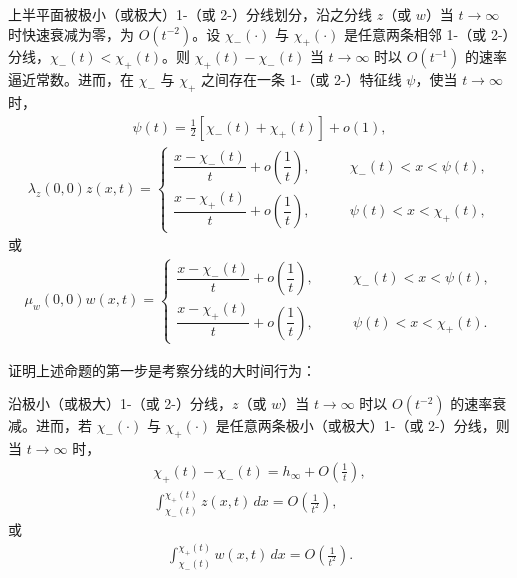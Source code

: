 \documentclass[../../main.tex]{subfiles}
\begin{document}
\begin{theorem}\label{theorem:ch12-周期渐近}
上半平面被极小（或极大）1-（或 2-）分线划分，沿之分线 $z$（或 $w$）当 $t\to\infty$ 时快速衰减为零，为 $O(t^{-2})$。设 $\chi_-(\cdot)$ 与 $\chi_+(\cdot)$ 是任意两条相邻 1-（或 2-）分线，$\chi_-(t)<\chi_+(t)$。则 $\chi_+(t)-\chi_-(t)$ 当 $t\to\infty$ 时以 $O(t^{-1})$ 的速率逼近常数。进而，在 $\chi_-$ 与 $\chi_+$ 之间存在一条 1-（或 2-）特征线 $\psi$，使当 $t\to\infty$ 时，
\begin{align}
\psi(t)=\tfrac12[\chi_-(t)+\chi_+(t)]+o(1),
\label{align:ch12-中线}
\end{align}
\begin{align}
\lambda_z(0,0)z(x,t)=
\begin{cases}
\dfrac{x-\chi_-(t)}{t}+o\left(\dfrac1t\right),\qquad &\chi_-(t)<x<\psi(t),\\[2mm]
\dfrac{x-\chi_+(t)}{t}+o\left(\dfrac1t\right),\qquad &\psi(t)<x<\chi_+(t),
\end{cases}
\label{align:ch12-周期z}
\end{align}
或
\begin{align}
\mu_w(0,0)w(x,t)=
\begin{cases}
\dfrac{x-\chi_-(t)}{t}+o\left(\dfrac1t\right),\qquad &\chi_-(t)<x<\psi(t),\\[2mm]
\dfrac{x-\chi_+(t)}{t}+o\left(\dfrac1t\right),\qquad &\psi(t)<x<\chi_+(t).
\end{cases}
\label{align:ch12-周期w}
\end{align}
\end{theorem}

证明上述命题的第一步是考察分线的大时间行为：

\begin{lemma}\label{lemma:ch12-分线衰减}
沿极小（或极大）1-（或 2-）分线，$z$（或 $w$）当 $t\to\infty$ 时以 $O(t^{-2})$ 的速率衰减。进而，若 $\chi_-(\cdot)$ 与 $\chi_+(\cdot)$ 是任意两条极小（或极大）1-（或 2-）分线，则当 $t\to\infty$ 时，
\begin{align}
\chi_+(t)-\chi_-(t)=h_\infty+O\left(\frac1t\right),
\label{align:ch12-分线间距}\\
\int_{\chi_-(t)}^{\chi_+(t)}z(x,t)\,dx=O\left(\frac1{t^2}\right),
\label{align:ch12-分线积分1}
\end{align}
或
\begin{align}
\int_{\chi_-(t)}^{\chi_+(t)}w(x,t)\,dx=O\left(\frac1{t^2}\right).
\label{align:ch12-分线积分2}
\end{align}
\end{lemma}
\end{document}
